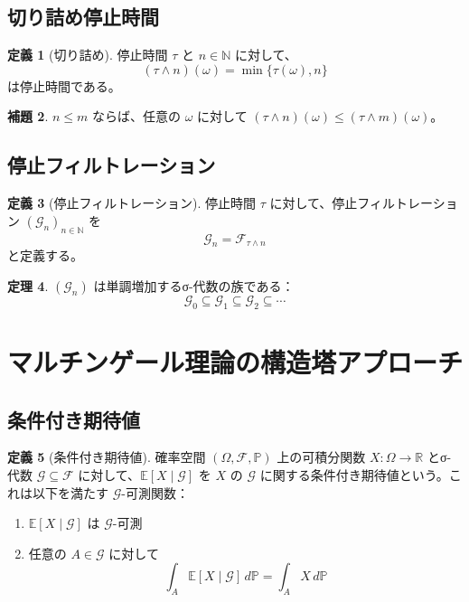 \documentclass[a4paper,12pt]{article}
\theoremstyle{definition}
\newtheorem{definition}{定義}[section]
\newtheorem{theorem}[definition]{定理}
\newtheorem{lemma}[definition]{補題}
\begin{document}
\subsection{切り詰め停止時間}

\begin{definition}[切り詰め]
停止時間 $\tau$ と $n \in \mathbb{N}$ に対して、
\[
(\tau \wedge n)(\omega) = \min\{\tau(\omega), n\}
\]
は停止時間である。
\end{definition}

\begin{lemma}
$n \leq m$ ならば、任意の $\omega$ に対して $(\tau \wedge n)(\omega) \leq (\tau \wedge m)(\omega)$。
\end{lemma}

\subsection{停止フィルトレーション}

\begin{definition}[停止フィルトレーション]
停止時間 $\tau$ に対して、停止フィルトレーション $(\mathcal{G}_n)_{n \in \mathbb{N}}$ を
\[
\mathcal{G}_n = \mathcal{F}_{\tau \wedge n}
\]
と定義する。
\end{definition}

\begin{theorem}
$(\mathcal{G}_n)$ は単調増加するσ-代数の族である：
\[
\mathcal{G}_0 \subseteq \mathcal{G}_1 \subseteq \mathcal{G}_2 \subseteq \cdots
\]
\end{theorem}

\section{マルチンゲール理論の構造塔アプローチ}

\subsection{条件付き期待値}

\begin{definition}[条件付き期待値]
確率空間 $(\Omega, \mathcal{F}, \mathbb{P})$ 上の可積分関数 $X : \Omega \to \mathbb{R}$ とσ-代数 $\mathcal{G} \subseteq \mathcal{F}$ に対して、$\mathbb{E}[X \mid \mathcal{G}]$ を $X$ の $\mathcal{G}$ に関する条件付き期待値という。これは以下を満たす $\mathcal{G}$-可測関数：
\begin{enumerate}
\item $\mathbb{E}[X \mid \mathcal{G}]$ は $\mathcal{G}$-可測
\item 任意の $A \in \mathcal{G}$ に対して
\[
\int_A \mathbb{E}[X \mid \mathcal{G}] \, d\mathbb{P} = \int_A X \, d\mathbb{P}
\]
\end{enumerate}
\end{definition}
\end{document}
